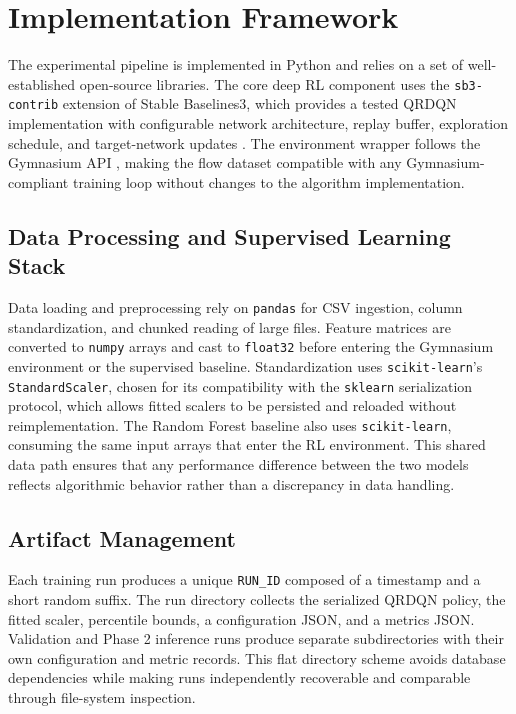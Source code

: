 \section{Implementation Framework}
The experimental pipeline is implemented in Python and relies on a set of well-established open-source libraries. The core deep RL component uses the \texttt{sb3-contrib} extension of Stable Baselines3, which provides a tested QRDQN implementation with configurable network architecture, replay buffer, exploration schedule, and target-network updates \parencite{SB3ContribQRDQNDocs}. The environment wrapper follows the Gymnasium API \parencite{GymnasiumDocs}, making the flow dataset compatible with any Gymnasium-compliant training loop without changes to the algorithm implementation.

\subsection{Data Processing and Supervised Learning Stack}
Data loading and preprocessing rely on \texttt{pandas} for CSV ingestion, column standardization, and chunked reading of large files. Feature matrices are converted to \texttt{numpy} arrays and cast to \texttt{float32} before entering the Gymnasium environment or the supervised baseline. Standardization uses \texttt{scikit-learn}'s \texttt{StandardScaler}, chosen for its compatibility with the \texttt{sklearn} serialization protocol, which allows fitted scalers to be persisted and reloaded without reimplementation. The Random Forest baseline also uses \texttt{scikit-learn}, consuming the same input arrays that enter the RL environment. This shared data path ensures that any performance difference between the two models reflects algorithmic behavior rather than a discrepancy in data handling.

\subsection{Artifact Management}
Each training run produces a unique \texttt{RUN\_ID} composed of a timestamp and a short random suffix. The run directory collects the serialized QRDQN policy, the fitted scaler, percentile bounds, a configuration JSON, and a metrics JSON. Validation and Phase 2 inference runs produce separate subdirectories with their own configuration and metric records. This flat directory scheme avoids database dependencies while making runs independently recoverable and comparable through file-system inspection.

